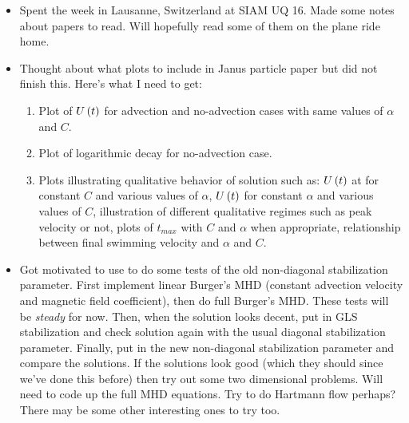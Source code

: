 \begin{itemize}
  \item Spent the week in Lausanne, Switzerland at SIAM UQ 16.  Made some notes about papers to read.  Will hopefully read some of them on the plane ride home.
  \item Thought about what plots to include in Janus particle paper but did not finish this.  Here's what I need to get:
    \begin{enumerate}
      \item Plot of $U\left(t\right)$ for advection and no-advection cases with same values of $\alpha$ and $C$.
      \item Plot of logarithmic decay for no-advection case.
      \item Plots illustrating qualitative behavior of solution such as:  $U\left(t\right)$ at for constant $C$ and various values of $\alpha$, $U\left(t\right)$ for constant $\alpha$ and various values of $C$, illustration of different qualitative regimes such as peak velocity or not, plots of $t_{max}$ with $C$ and $\alpha$ when appropriate, relationship between final swimming velocity and $\alpha$ and $C$.
    \end{enumerate}
  \item Got motivated to use \fenics to do some tests of the old non-diagonal stabilization parameter.  First implement linear Burger's MHD (constant advection velocity and magnetic field coefficient), then do full Burger's MHD.  These tests will be \textit{steady} for now.  Then, when the solution looks decent, put in GLS stabilization and check solution again with the usual diagonal stabilization parameter.  Finally, put in the new non-diagonal stabilization parameter and compare the solutions.  If the solutions look good (which they should since we've done this before) then try out some two dimensional problems.  Will need to code up the full MHD equations.  Try to do Hartmann flow perhaps?  There may be some other interesting ones to try too.
\end{itemize}

